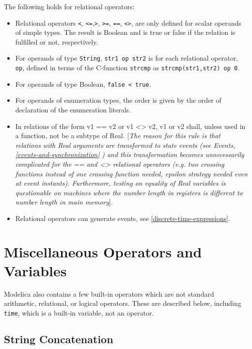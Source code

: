 The following holds for relational operators:

\begin{itemize}
\item
  Relational operators \lstinline!<!, \lstinline!<=!,\lstinline!>!,
\lstinline!>=!, \lstinline!==!, \lstinline!<>!, are only defined for
  scalar operands of simple types. The result is Boolean and is true or
  false if the relation is fulfilled or not, respectively.
\item
  For operands of type \lstinline!String!, \lstinline!str1 op str2! is for each relational
  operator, \lstinline!op!, defined in terms of the C-function \lstinline!strcmp! as
  \lstinline!strcmp(str1,str2) op 0!.
\item
  For operands of type Boolean,
\lstinline!false < true!.
\item
  For operands of enumeration types, the order is given by the order of
  declaration of the enumeration literals.
\item
  In relations of the form v1 == v2 or v1 \textless{}\textgreater{} v2,
  v1 or v2 shall, unless used in a function, not be a subtype of Real.
  {[}\emph{The reason for this rule is that relations with Real
  arguments are transformed to state events (see Events, \autoref{events-and-synchronization}}
  \emph{) and this transformation becomes unnecessarily complicated
  for the == and \textless{}\textgreater{} relational operators (e.g.
  two crossing functions instead of one crossing function needed,
  epsilon strategy needed even at event instants). Furthermore, testing
  on equality of Real variables is questionable on machines where the
  number length in registers is different to number length in main
  memory}{]}.
\item
  Relational operators can generate events, see \autoref{discrete-time-expressions}.
\end{itemize}

\section{Miscellaneous Operators and Variables}

Modelica also contains a few built-in operators which are not standard
arithmetic, relational, or logical operators. These are described below,
including \lstinline!time!, which is a built-in variable, not an operator.

\subsection{String Concatenation}

